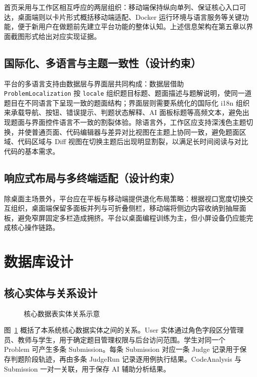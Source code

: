 首页采用与工作区相互呼应的两层组织：移动端保持纵向单列、保证核心入口可达，桌面端则以卡片形式概括移动端适配、Docker 运行环境与语言服务等关键功能，便于新用户在做题前先建立平台功能的整体认知。上述信息架构在第五章以界面截图形式给出对应实现证据。

\subsection{国际化、多语言与主题一致性（设计约束）}

平台的多语言支持由数据层与界面层共同构成：数据层借助 \texttt{ProblemLocalization} 按 \texttt{locale} 组织题目标题、题面描述与题解说明，使同一道题目在不同语言下呈现一致的题面结构；界面层则需要系统化的国际化 i18n 组织来承载导航、按钮、错误提示、判题状态解释、AI 面板标题等高频文本，避免出现题面与界面控件语言不一致的割裂体验。除语言外，工作区应支持深浅色主题切换，并使普通页面、代码编辑器与差异对比视图在主题上协同一致，避免题面区域、代码区域与 Diff 视图在切换主题后出现明显割裂，以满足长时间阅读与对比代码的基本需求。

\subsection{响应式布局与多终端适配（设计约束）}

除桌面主场景外，平台应在平板与移动端提供退化布局策略：根据视口宽度切换交互组织，桌面端保留多面板并列与可折叠侧栏，移动端将侧边内容收纳到抽屉面板，避免窄屏固定多栏造成拥挤。平台以桌面编程训练为主，但小屏设备仍应能完成核心操作链路。

\section{数据库设计}

\subsection{核心实体与关系设计}

\begin{figure}[htbp]
  \centering
  \resizebox{\linewidth}{!}{}
  \caption{核心数据表实体关系示意}
  \label{fig:ch4-er}
\end{figure}

图~\ref{fig:ch4-er} 概括了本系统核心数据实体之间的关系。User 实体通过角色字段区分管理员、教师与学生，用于确定题目管理权限与后台访问范围。学生对同一个 Problem 可产生多条 Submission。每条 Submission 对应一条 Judge 记录用于保存判题阶段轨迹，再由多条 JudgeRun 记录逐用例执行结果。CodeAnalysis 与 Submission 一对一关联，用于保存 AI 辅助分析结果。

